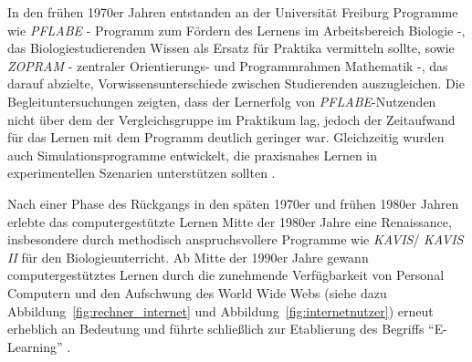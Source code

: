 In den frühen 1970er Jahren entstanden an der Universität Freiburg Programme wie \textit{PFLABE} - Programm zum Fördern des Lernens im Arbeitsbereich Biologie -, das Biologiestudierenden Wissen als Ersatz für Praktika vermitteln sollte, sowie \textit{ZOPRAM} - zentraler Orientierungs- und Programmrahmen Mathematik -, das darauf abzielte, Vorwissensunterschiede zwischen Studierenden auszugleichen. Die Begleituntersuchungen zeigten, dass der Lernerfolg von \textit{PFLABE}-Nutzenden nicht über dem der Vergleichsgruppe im Praktikum lag, jedoch der Zeitaufwand für das Lernen mit dem Programm deutlich geringer war. Gleichzeitig wurden auch Simulationsprogramme entwickelt, die praxisnahes Lernen in experimentellen Szenarien unterstützen sollten \parencite[S.~11]{niegemann_kompendium_2008}.

Nach einer Phase des Rückgangs in den späten 1970er und frühen 1980er Jahren erlebte das computergestützte Lernen Mitte der 1980er Jahre eine Renaissance, insbesondere durch methodisch anspruchsvollere Programme wie \textit{KAVIS}/ \textit{KAVIS II} für den Biologieunterricht. Ab Mitte der 1990er Jahre gewann computergestütztes Lernen durch die zunehmende Verfügbarkeit von Personal Computern und den Aufschwung des World Wide Webs (siehe dazu Abbildung~\ref{fig:rechner_internet} und Abbildung~\ref{fig:internetnutzer}) erneut erheblich an Bedeutung und führte schließlich zur Etablierung des Begriffs \enquote{E-Learning} \parencite[S.~11]{niegemann_kompendium_2008}.
\fi

